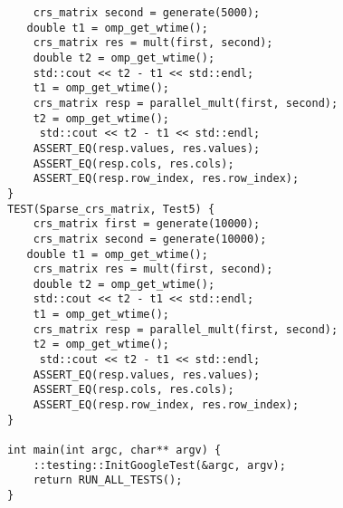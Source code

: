 \documentclass{report}
\begin{document}
\begin{lstlisting}
    crs_matrix second = generate(5000);
   double t1 = omp_get_wtime();
    crs_matrix res = mult(first, second);
    double t2 = omp_get_wtime();
    std::cout << t2 - t1 << std::endl;
    t1 = omp_get_wtime();
    crs_matrix resp = parallel_mult(first, second);
    t2 = omp_get_wtime();
     std::cout << t2 - t1 << std::endl;
    ASSERT_EQ(resp.values, res.values);
    ASSERT_EQ(resp.cols, res.cols);
    ASSERT_EQ(resp.row_index, res.row_index);
}
TEST(Sparse_crs_matrix, Test5) {
    crs_matrix first = generate(10000);
    crs_matrix second = generate(10000);
   double t1 = omp_get_wtime();
    crs_matrix res = mult(first, second);
    double t2 = omp_get_wtime();
    std::cout << t2 - t1 << std::endl;
    t1 = omp_get_wtime();
    crs_matrix resp = parallel_mult(first, second);
    t2 = omp_get_wtime();
     std::cout << t2 - t1 << std::endl;
    ASSERT_EQ(resp.values, res.values);
    ASSERT_EQ(resp.cols, res.cols);
    ASSERT_EQ(resp.row_index, res.row_index);
}

int main(int argc, char** argv) {
    ::testing::InitGoogleTest(&argc, argv);
    return RUN_ALL_TESTS();
}
\end{lstlisting}
\end{document}
